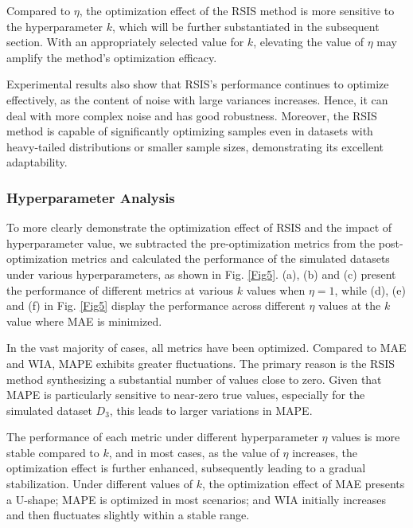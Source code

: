 \documentclass[final,3p,times]{elsarticle}
\begin{document}
Compared to $\eta$, the optimization effect of the RSIS method 
is more sensitive to the hyperparameter $k$, which will be 
further substantiated in the subsequent section. With an 
appropriately selected value for $k$, elevating the value of 
$\eta$ may amplify the method's optimization efficacy.

Experimental results also show that RSIS's performance continues 
to optimize effectively, as the content of noise with large 
variances increases. Hence, it can deal with more complex noise 
and has good robustness. Moreover, the RSIS method is capable of 
significantly optimizing samples even in datasets with 
heavy-tailed distributions or smaller sample sizes, demonstrating 
its excellent adaptability. 







\subsubsection{Hyperparameter Analysis}
To more clearly demonstrate the optimization effect of RSIS and 
the impact of hyperparameter value, we subtracted the 
pre-optimization metrics from the post-optimization metrics 
and calculated the performance of the simulated datasets under 
various hyperparameters, as shown in Fig. \ref{Fig5}. (a), (b) and (c) 
present the performance of different metrics at various $k$ values 
when $\eta=1$, while (d), (e) and (f) in Fig. \ref{Fig5} display the 
performance across different $\eta$ values at the $k$ value 
where MAE is minimized. 



In the vast majority of cases, all metrics have been optimized. 
Compared to MAE and WIA, MAPE exhibits greater fluctuations. 
The primary reason is the RSIS method synthesizing a substantial 
number of values close to zero. Given that MAPE is particularly 
sensitive to near-zero true values, especially for the simulated 
dataset $D_3$, this leads to larger variations in MAPE.

The performance of each metric under different hyperparameter 
$\eta$ values is more stable compared to $k$, and in most cases, 
as the value of $\eta$ increases, the optimization effect is 
further enhanced, subsequently leading to a gradual stabilization. 
Under different values of $k$, the optimization effect of MAE 
presents a U-shape; MAPE is optimized in most scenarios; and 
WIA initially increases and then fluctuates slightly within a 
stable range.
\end{document}
